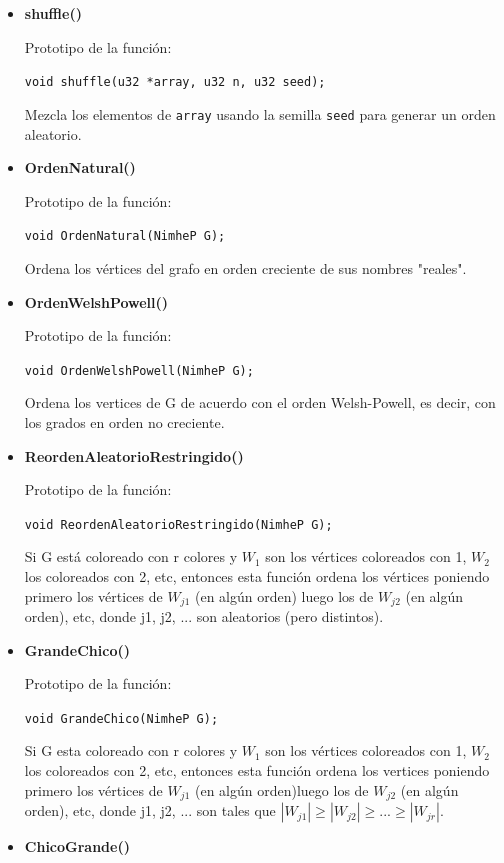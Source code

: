 \documentclass[11pt,a4paper]{article}
\theoremstyle{plain}
\begin{document}
\begin{itemize}
\item{\textbf{{shuffle()}}}

Prototipo de la función:

\texttt{void shuffle(u32 *array, u32 n, u32 seed);}

Mezcla los elementos de \texttt{array} usando la semilla \texttt{seed} para generar un orden aleatorio.

\item{\textbf{{OrdenNatural()}}}

Prototipo de la función:

\texttt{void OrdenNatural(NimheP G);}

Ordena los vértices del grafo en orden creciente de sus nombres "reales".

\item{\textbf{{OrdenWelshPowell()}}}

Prototipo de la función:

\texttt{void OrdenWelshPowell(NimheP G);}

Ordena los vertices de G de acuerdo con el orden Welsh-Powell, es decir, con los grados en orden no creciente.

\item{\textbf{{ReordenAleatorioRestringido()}}}

Prototipo de la función:

\texttt{void ReordenAleatorioRestringido(NimheP G);}

Si G está coloreado con r colores y $W_{1}$ son los vértices coloreados con 1, $W_2$ los coloreados con 2, etc, entonces esta función ordena los vértices poniendo primero los vértices de $W_{j1}$ (en algún orden) luego los de $W_{j2}$ (en algún orden), etc, donde j1, j2, ... son aleatorios (pero distintos).

\item{\textbf{{GrandeChico()}}}

Prototipo de la función:

\texttt{void GrandeChico(NimheP G);}

Si G esta coloreado con r colores y $W_{1}$ son los vértices coloreados con 1, $W_{2}$ los coloreados con 2,
etc, entonces esta función ordena los vertices poniendo primero los vértices de $W_{j1}$ (en algún orden)luego los de $W_{j2}$ (en algún orden), etc, donde j1, j2, ... son tales que $|W_{j1}| \geq |W_{j2}| \geq  ... \geq |W_{jr}|$.

\item{\textbf{{ChicoGrande()}}}


\end{itemize}
\end{document}

